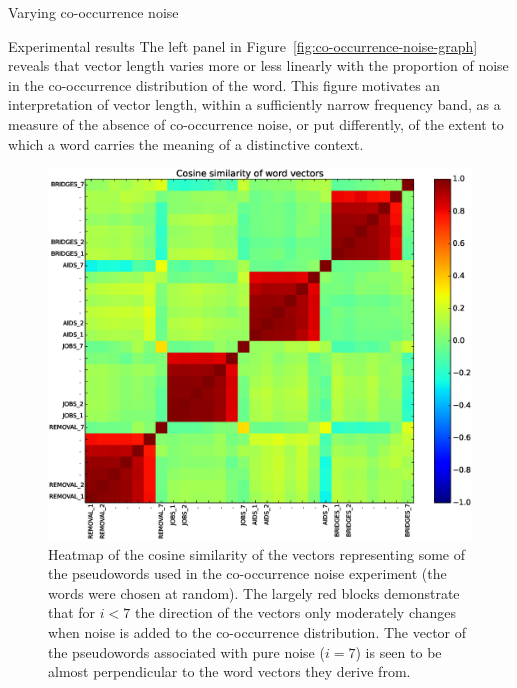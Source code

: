 \documentclass{article} %
\begin{document}
\begin{section}{Varying co-occurrence noise}
\begin{subsection}{Experimental results}
The left panel in Figure~\ref{fig:co-occurrence-noise-graph} reveals
that vector length varies more or less linearly with the proportion of
noise in the co-occurrence distribution of the word.  This figure
motivates an interpretation of vector length, within a sufficiently
narrow frequency band, as a measure of the absence of co-occurrence
noise, or put differently, of the extent to which a word carries the
meaning of a distinctive context.


\begin{figure}
	\includegraphics[scale=0.5]{cooccurrence-noise-heatmap}
	\caption{ Heatmap of the cosine similarity of the vectors
          representing some of the pseudowords used in the co-occurrence
          noise experiment (the words were chosen at random).  The
          largely red blocks demonstrate that for $i<7$ the direction of
          the vectors only moderately changes when noise is added to the
          co-occurrence distribution.  The vector of the pseudowords
          associated with pure noise ($i=7$) is seen to be almost
          perpendicular to the word vectors they derive from. }
	\label{fig:co-occurrence-noise-heatmap}
\end{figure}


\end{subsection}
\end{section}
\end{document}
